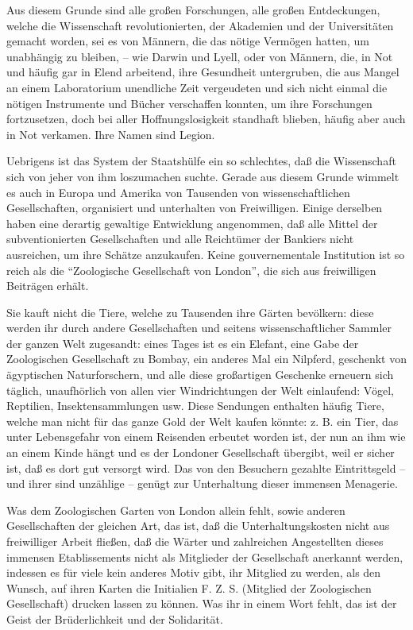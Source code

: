 \documentclass{scrbook}
\begin{document}
Aus diesem Grunde sind alle großen Forschungen, alle großen Entdeckungen, welche die Wissenschaft revolutionierten,  der Akademien und der Universitäten gemacht worden, sei es von Männern, die das nötige Vermögen hatten, um unabhängig zu bleiben, – wie Darwin und Lyell, oder von Männern, die, in Not und häufig gar in Elend arbeitend, ihre Gesundheit untergruben, die aus Mangel an einem Laboratorium unendliche Zeit vergeudeten und sich nicht einmal die nötigen Instrumente und Bücher verschaffen konnten, um ihre Forschungen fortzusetzen, doch bei aller Hoffnungslosigkeit standhaft blieben, häufig aber auch in Not verkamen. Ihre Namen sind Legion.

Uebrigens ist das System der Staatshülfe ein so schlechtes, daß die Wissenschaft sich von jeher von ihm loszumachen suchte. Gerade aus diesem Grunde wimmelt es auch in Europa und Amerika von Tausenden von wissenschaftlichen Gesellschaften, organisiert und unterhalten von Freiwilligen. Einige derselben haben eine derartig gewaltige Entwicklung angenommen, daß alle Mittel der subventionierten Gesellschaften und alle Reichtümer der Bankiers nicht ausreichen, um ihre Schätze anzukaufen. Keine gouvernementale Institution ist so reich als die ``Zoologische Gesellschaft von London'', die sich aus freiwilligen Beiträgen erhält.

Sie kauft nicht die Tiere, welche zu Tausenden ihre Gärten bevölkern: diese werden ihr durch andere Gesellschaften und seitens wissenschaftlicher Sammler der ganzen Welt zugesandt: eines Tages ist es ein Elefant, eine Gabe der Zoologischen Gesellschaft zu Bombay, ein anderes Mal ein Nilpferd, geschenkt von ägyptischen Naturforschern, und alle diese großartigen Geschenke erneuern sich täglich, unaufhörlich von allen vier Windrichtungen der Welt einlaufend: Vögel, Reptilien, Insektensammlungen usw. Diese Sendungen enthalten häufig Tiere, welche man nicht für das ganze Gold der Welt kaufen könnte: z. B. ein Tier, das unter Lebensgefahr von einem Reisenden erbeutet worden ist, der nun an ihm wie an einem Kinde hängt und es der Londoner Gesellschaft übergibt, weil er sicher ist, daß es dort gut versorgt wird. Das von den Besuchern gezahlte Eintrittsgeld – und ihrer sind unzählige – genügt zur Unterhaltung dieser immensen Menagerie.

Was dem Zoologischen Garten von London allein fehlt, sowie anderen Gesellschaften der gleichen Art, das ist, daß die Unterhaltungskosten nicht aus freiwilliger Arbeit fließen, daß die Wärter und zahlreichen Angestellten dieses immensen Etablissements nicht als Mitglieder der Gesellschaft anerkannt werden, indessen es für viele kein anderes Motiv gibt, ihr Mitglied zu werden, als den Wunsch, auf ihren Karten die Initialien F. Z. S. (Mitglied der Zoologischen Gesellschaft) drucken lassen zu können. Was ihr in einem Wort fehlt, das ist der Geist der Brüderlichkeit und der Solidarität.
\end{document}
